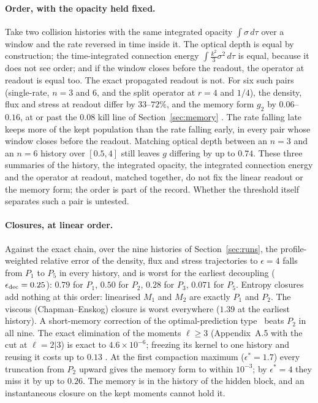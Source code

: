 \paragraph{Order, with the opacity held fixed.} Take two collision histories with the same integrated opacity $\int\sigma\,d\tau$ over a window and the rate reversed in time inside it. The optical depth is equal by construction; the time-integrated connection energy $\int\tfrac{k^2}{3}\sigma^2\,d\tau$ is equal, because it does not see order; and if the window closes before the readout, the operator at readout is equal too. The exact propagated readout is not. For six such pairs (single-rate, $n=3$ and $6$, and the split operator at $r=4$ and $1/4$), the density, flux and stress at readout differ by $33$--$72\%$, and the memory form $g_2$ by $0.06$--$0.16$, at or past the $0.08$ kill line of Section~\ref{sec:memory} . The rate falling late keeps more of the kept population than the rate falling early, in every pair whose window closes before the readout. Matching optical depth between an $n=3$ and an $n=6$ history over $[0.5,4]$ still leaves $g$ differing by up to $0.74$. These three summaries of the history, the integrated opacity, the integrated connection energy and the operator at readout, matched together, do not fix the linear readout or the memory form; the order is part of the record. Whether the threshold itself separates such a pair is untested.

\paragraph{Closures, at linear order.} Against the exact chain, over the nine histories of Section~\ref{sec:runs}, the profile-weighted relative error of the density, flux and stress trajectories to $\epsilon=4$ falls from $P_1$ to $P_5$ in every history, and is worst for the earliest decoupling ($\epsilon_{\rm dec}=0.25$): $0.79$ for $P_1$, $0.50$ for $P_2$, $0.28$ for $P_3$, $0.071$ for $P_5$. Entropy closures add nothing at this order: linearised $M_1$ and $M_2$ are exactly $P_1$ and $P_2$. The viscous (Chapman--Enskog) closure is worst everywhere ($1.39$ at the earliest history). A short-memory correction of the optimal-prediction type~\cite{SF} beats $P_2$ in all nine. The exact elimination of the moments $\ell\ge3$ (Appendix~A.5 with the cut at $\ell=2|3$) is exact to $4.6\times10^{-6}$; freezing its kernel to one history and reusing it costs up to $0.13$ . At the first compaction maximum ($\epsilon^\ast=1.7$) every truncation from $P_2$ upward gives the memory form to within $10^{-3}$; by $\epsilon^\ast=4$ they miss it by up to $0.26$. The memory is in the history of the hidden block, and an instantaneous closure on the kept moments cannot hold it.

